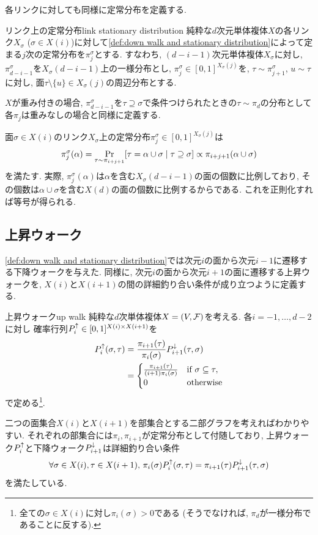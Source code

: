 各リンクに対しても同様に定常分布を定義する.
\begin{definition}{リンク上の定常分布}{link stationary distribution}
    純粋な$d$次元単体複体$X$の各リンク$X_\sigma$ ($\sigma \in X(i)$)に対して\cref{def:down walk and stationary distribution}によって定まる$j$次の定常分布を$\pi^\sigma_j$とする.
    すなわち, $(d-i-1)$次元単体複体$X_\sigma$に対し, $\pi^\sigma_{d-i-1}$を$X_\sigma(d-i-1)$上の一様分布とし,
    $\pi^\sigma_j\in [0,1]^{X_\sigma(j)}$を, $\tau\sim \pi^\sigma_{j+1}$, $u\sim \tau$に対し, 面$\tau\setminus \{u\} \in X_\sigma(j)$の周辺分布とする.

    $X$が重み付きの場合, $\pi^\sigma_{d-i-1}$を$\tau \supseteq \sigma$で条件つけられたときの$\tau\sim\pi_d$の分布として各$\pi_j$は重みなしの場合と同様に定義する.
\end{definition}
    面$\sigma\in X(i)$のリンク$X_\sigma$上の定常分布$\pi^\sigma_j \in[0,1]^{X_\sigma(j)}$は
    \begin{align}
    \pi^\sigma_j(\alpha) = \Pr_{\tau\sim\pi_{i+j+1}}\sbra*{\tau=\alpha\cup \sigma \condition \tau\supseteq \sigma} \propto \pi_{i+j+1}(\alpha\cup\sigma) \label{eq:pi alpha j}
    \end{align}
    を満たす.
    実際, $\pi^\sigma_j(\alpha)$は$\alpha$を含む$X_\sigma(d-i-1)$の面の個数に比例しており,
    その個数は$\alpha\cup \sigma$を含む$X(d)$の面の個数に比例するからである.
    これを正則化すれば等号が得られる.

\subsection{上昇ウォーク}
\cref{def:down walk and stationary distribution}では次元$i$の面から次元$i-1$に遷移する下降ウォークを与えた.
同様に, 次元$i$の面から次元$i+1$の面に遷移する上昇ウォークを, $X(i)$と$X(i+1)$の間の詳細釣り合い条件が成り立つように定義する.
%
\begin{definition}{上昇ウォーク}{up walk}
    純粋な$d$次単体複体$X=(V,\mathcal{F})$を考える.
    各$i=-1,\dots,d-2$に対し
        確率行列$P^{\uparrow}_i \in [0,1]^{X(i) \times X(i+1)}$を
    \begin{align*}
        P^{\uparrow}_i(\sigma,\tau) &= \frac{\pi_{i+1}(\tau)}{\pi_i(\sigma)}P^{\downarrow}_{i+1}(\tau,\sigma) \\
        &= \begin{cases}
            \frac{\pi_{i+1}(\tau)}{(i+1)\pi_i(\sigma)}	& \text{if } \sigma\subseteq \tau,\\
            0 & \text{otherwise}
        \end{cases}
    \end{align*}
    で定める\footnote{全ての$\sigma\in X(i)$に対し$\pi_i(\sigma)>0$である
    (そうでなければ, $\pi_d$が一様分布であることに反する).
    }.
\end{definition}
%
二つの面集合$X(i)$と$X(i+1)$を部集合とする二部グラフを考えればわかりやすい.
それぞれの部集合には$\pi_i,\pi_{i+1}$が定常分布として付随しており,
上昇ウォーク$P^{\uparrow}_i$と下降ウォーク$P^{\downarrow}_{i+1}$は詳細釣り合い条件
\[
    \forall \sigma\in X(i),\tau\in X(i+1),\,\pi_i(\sigma)P^{\uparrow}_i(\sigma,\tau) = \pi_{i+1}(\tau)P^{\downarrow}_{i+1}(\tau,\sigma)
\]
を満たしている.


